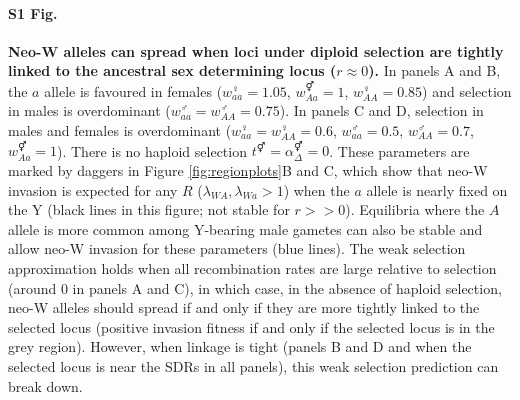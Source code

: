 \documentclass[10pt,letterpaper]{article}
\begin{document}
\paragraph*{S1 Fig.}
\label{fig:positionOverdominance}
{\bf Neo-W alleles can spread when loci under diploid selection are tightly linked to the ancestral sex determining locus ($r\approx0$). } 
In panels A and B, the $a$ allele is favoured in females ($w_{aa}^\female=1.05$, $w_{Aa}^\Hermaphrodite=1$, $w_{AA}^\female=0.85$) and selection in males is overdominant ($w_{aa}^\male=w_{AA}^\male=0.75$).
In panels C and D, selection in males and females is overdominant ($w_{aa}^\female=w_{AA}^\female=0.6$, $w_{aa}^\male=0.5$, $w_{AA}^\male=0.7$, $w_{Aa}^\Hermaphrodite=1$).
There is no haploid selection $t^\Hermaphrodite = \alpha^\Hermaphrodite_\Delta = 0$.
These parameters are marked by daggers in Figure \ref{fig:regionplots}B and C, which show that neo-W invasion is expected for any $R$ ($\lambda_{WA},\lambda_{Wa}>1$) when the $a$ allele is nearly fixed on the Y (black lines in this figure; not stable for $r>>0$). 
Equilibria where the $A$ allele is more common among Y-bearing male gametes can also be stable and allow neo-W invasion for these parameters (blue lines). 
The weak selection approximation holds when all recombination rates are large relative to selection (around 0 in panels A and C), in which case, in the absence of haploid selection, neo-W alleles should spread if and only if they are more tightly linked to the selected locus (positive invasion fitness if and only if the selected locus is in the grey region). 
However, when linkage is tight (panels B and D and when the selected locus is near the SDRs in all panels), this weak selection prediction can break down. 
\end{document}
